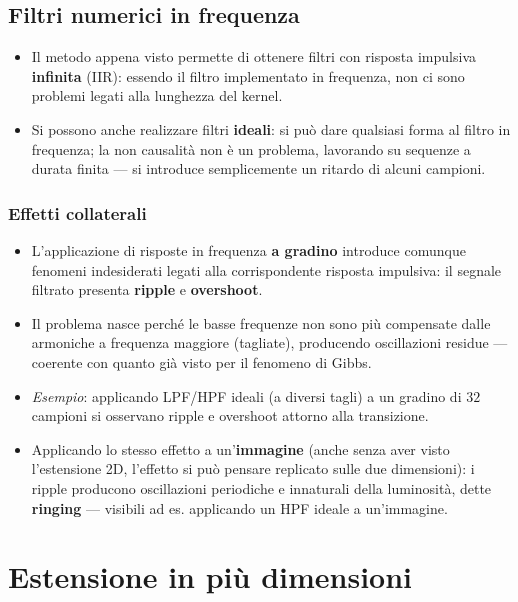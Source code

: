 \documentclass[12pt, a4paper]{article}
\begin{document}
\subsection{Filtri numerici in frequenza}
\begin{itemize}
    \item Il metodo appena visto permette di ottenere filtri con risposta impulsiva \textbf{infinita} (IIR): essendo il filtro implementato in frequenza, non ci sono problemi legati alla lunghezza del kernel.
    \item Si possono anche realizzare filtri \textbf{ideali}: si può dare qualsiasi forma al filtro in frequenza; la non causalità non è un problema, lavorando su sequenze a durata finita — si introduce semplicemente un ritardo di alcuni campioni.
\end{itemize}

\subsubsection{Effetti collaterali}
\begin{itemize}
    \item L'applicazione di risposte in frequenza \textbf{a gradino} introduce comunque fenomeni indesiderati legati alla corrispondente risposta impulsiva: il segnale filtrato presenta \textbf{ripple} e \textbf{overshoot}.
    \item Il problema nasce perché le basse frequenze non sono più compensate dalle armoniche a frequenza maggiore (tagliate), producendo oscillazioni residue — coerente con quanto già visto per il fenomeno di Gibbs.
    \item \textit{Esempio}: applicando LPF/HPF ideali (a diversi tagli) a un gradino di $32$ campioni si osservano ripple e overshoot attorno alla transizione.
    \item Applicando lo stesso effetto a un'\textbf{immagine} (anche senza aver visto l'estensione 2D, l'effetto si può pensare replicato sulle due dimensioni): i ripple producono oscillazioni periodiche e innaturali della luminosità, dette \textbf{ringing} — visibili ad es. applicando un HPF ideale a un'immagine.
\end{itemize}


\section{Estensione in più dimensioni}
\end{document}
